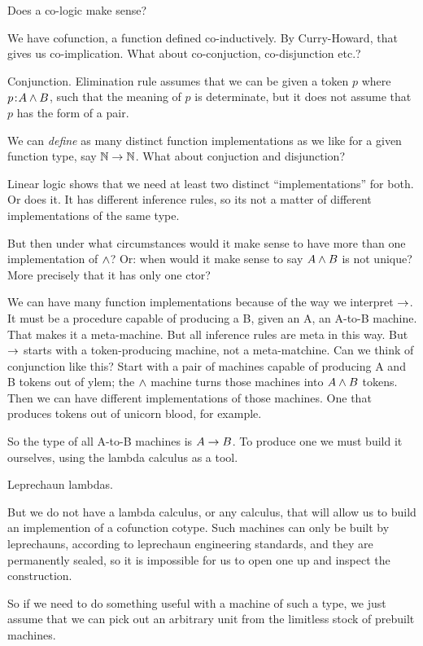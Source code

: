 \documentclass{article}
\begin{document}
Does a co-logic make sense?

We have cofunction, a function defined co-inductively. By
Curry-Howard, that gives us co-implication. What about co-conjuction,
co-disjunction etc.?

Conjunction. Elimination rule assumes that we can be given a token
\(p\) where \(p\hspace{1pt}\mathpunct{:}\hspace{-1pt}A\land B\), such that the meaning of \(p\) is
determinate, but it does not assume that \(p\) has the form of a pair.

We can \textit{define} as many distinct function implementations as we
like for a given function type, say \(\mathbb{N}\rightarrow\mathbb{N}\). What about
conjuction and disjunction?

Linear logic shows that we need at least two distinct
``implementations'' for both. Or does it. It has different inference
rules, so its not a matter of different implementations of the same
type.

But then under what circumstances would it make sense to have more
than one implementation of \(\land\)? Or: when would it make sense to
say \(A \land B\) is not unique? More precisely that it has only one
ctor?

We can have many function implementations because of the way we
interpret \(\rightarrow\). It must be a procedure capable of producing a B,
given an A, an A-to-B machine. That makes it a meta-machine. But all
inference rules are meta in this way. But \(\rightarrow\) starts with a
token-producing machine, not a meta-matchine. Can we think of
conjunction like this? Start with a pair of machines capable of
producing A and B tokens out of ylem; the \(\land\) machine turns
those machines into \(A\land B\) tokens. Then we can have different
implementations of those machines. One that produces tokens out of
unicorn blood, for example.

So the type of all A-to-B machines is \(A\rightarrow B\). To produce one we
must build it ourselves, using the lambda calculus as a tool.

Leprechaun lambdas.

But we do not have a lambda calculus, or any calculus, that will allow
us to build an implemention of a cofunction cotype. Such machines can
only be built by leprechauns, according to leprechaun engineering
standards, and they are permanently sealed, so it is impossible for us
to open one up and inspect the construction.

So if we need to do something useful with a machine of such a type, we
just assume that we can pick out an arbitrary unit from the limitless
stock of prebuilt machines.
\end{document}
